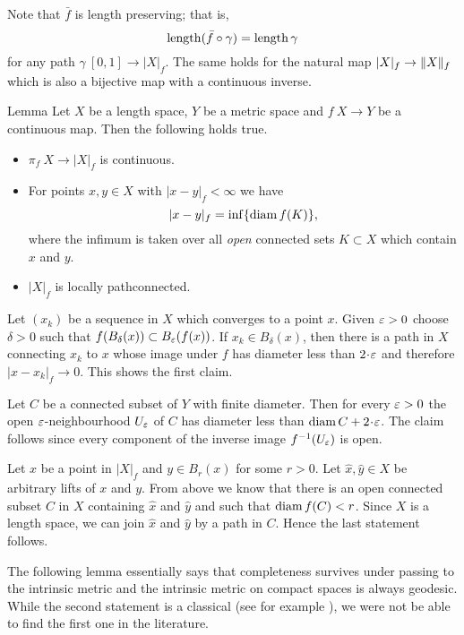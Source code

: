 \documentclass{article}
\begin{document}
Note that  $\bar f$
is length preserving;
that is,
\[\mathop{\rm length}\nolimits(\bar f\circ\gamma)=\mathop{\rm length}\nolimits\gamma\]
for any path $\gamma\:[0,1]\to |X|_f$.
The same holds for the natural map $|X|_f\zz\to \|X\|_f$ which is also a bijective map with a continuous inverse.

\begin{thm}{Lemma}\label{lem:picont}
Let $X$ be a length space, $Y$ be a metric space and $f\:X\to Y$ be a continuous map. 
Then the following holds true.
\begin{itemize}
\item $\pi_f\:X\to|X|_f$ is continuous.

 \item For points $x,y\in X$ with $|x-y|_f<\infty$ we have
\[|x-y|_f=\inf\{\mathop{\rm diam}\nolimits f(K)\},\]
where the infimum is taken over all {\em open} connected sets $K\subset X$ which contain $x$ and $y$.

\item $|X|_f$ is locally pathconnected.
\end{itemize}

\end{thm}

Let $(x_k)$ be a sequence in $X$ which converges to a point $x$. 
Given $\varepsilon>0$ choose $\delta>0$ such that $f(B_\delta(x))\subset B_\varepsilon(f(x))$. 
If $x_k\in B_\delta(x)$, then there is a path in $X$ connecting $x_k$ to $x$ whose image under $f$ has diameter less than $2\cdot\eps$ and therefore $|x-x_k|_f\to 0$. 
This shows the first claim.

Let $C$ be a connected subset of $Y$ with finite diameter. 
Then for every $\varepsilon>0$ the open $\varepsilon$-neighbourhood $U_\varepsilon$ of $C$ has diameter less than $\diam C+2\cdot\eps$. 
The claim follows since every component of the inverse image $f^{-1}(U_\varepsilon)$ is open. 

Let $x$ be a point in $|X|_f$ and $y\in B_r(x)$ for some $r>0$. 
Let $\hat x,\hat y\in X$ be arbitrary lifts of $x$ and $y$.
From above we know that there is an open connected subset $C$ in $X$ containing $\hat x$ and $\hat y$ and such that 
$\mathop{\rm diam}\nolimits f(C)<r$. 
Since $X$ is a length space, we can join $\hat x$ and $\hat y$ by a path in $C$.
Hence the last statement follows.
\qeds

The following lemma essentially says that completeness survives under passing to the intrinsic metric
and the intrinsic metric on compact spaces is always geodesic.
While the second statement is a classical (see for example \cite[II-\S8 Thm. 3]{KF}), 
we were not be able to find the first one in the literature.
\end{document}
